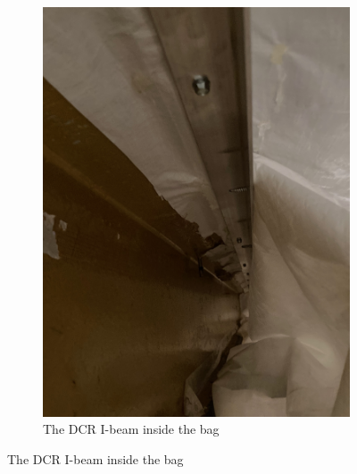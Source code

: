 \documentclass[11pt]{article}
\begin{document}
\begin{figure}[htbp]
\begin{center}
\begin{subfigure}{0.45\textwidth}
	\includegraphics[width=\textwidth]{IMG_5306.jpeg}
	\caption{The DCR I-beam inside the bag}
	\label{fig:inbag}
	\end{subfigure}
	
\end{center}
\end{figure}
\end{document}
